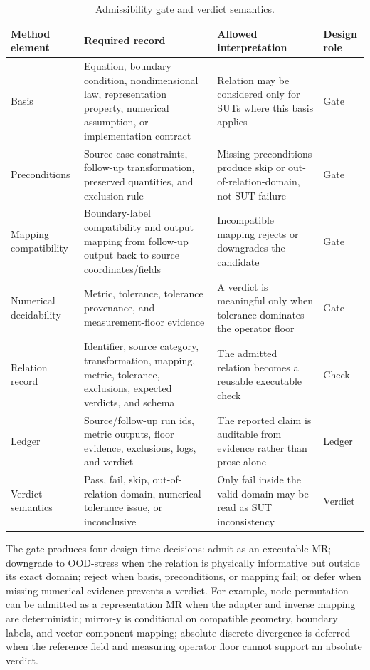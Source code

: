 \documentclass[preprint,12pt,authoryear]{elsarticle}
\begin{document}
\begin{table}[!htbp]
\centering
\caption{Admissibility gate and verdict semantics.}
\label{tab:admissibility-gate}
\footnotesize
\renewcommand{\arraystretch}{0.92}
\setlength{\tabcolsep}{3pt}
\begin{tabularx}{\textwidth}{@{}>{\raggedright\arraybackslash}p{}>{\raggedright\arraybackslash}p{}>{\raggedright\arraybackslash}p{}Y@{}}
\toprule
\textbf{Method element} & \textbf{Required record} & \textbf{Allowed interpretation} & \textbf{Design role} \\
\midrule
Basis & Equation, boundary condition, nondimensional law, representation property, numerical assumption, or implementation contract & Relation may be considered only for SUTs where this basis applies & Gate \\
Preconditions & Source-case constraints, follow-up transformation, preserved quantities, and exclusion rule & Missing preconditions produce skip or out-of-relation-domain, not SUT failure & Gate \\
Mapping compatibility & Boundary-label compatibility and output mapping from follow-up output back to source coordinates/fields & Incompatible mapping rejects or downgrades the candidate & Gate \\
Numerical decidability & Metric, tolerance, tolerance provenance, and measurement-floor evidence & A verdict is meaningful only when tolerance dominates the operator floor & Gate \\
Relation record & Identifier, source category, transformation, mapping, metric, tolerance, exclusions, expected verdicts, and schema & The admitted relation becomes a reusable executable check & Check \\
Ledger & Source/follow-up run ids, metric outputs, floor evidence, exclusions, logs, and verdict & The reported claim is auditable from evidence rather than prose alone & Ledger \\
Verdict semantics & Pass, fail, skip, out-of-relation-domain, numerical-tolerance issue, or inconclusive & Only fail inside the valid domain may be read as SUT inconsistency & Verdict \\
\bottomrule
\end{tabularx}
\end{table}

The gate produces four design-time decisions: admit as an executable MR; downgrade to OOD-stress when the relation is physically informative but outside its exact domain; reject when basis, preconditions, or mapping fail; or defer when missing numerical evidence prevents a verdict. For example, node permutation can be admitted as a representation MR when the adapter and inverse mapping are deterministic; mirror-y is conditional on compatible geometry, boundary labels, and vector-component mapping; absolute discrete divergence is deferred when the reference field and measuring operator floor cannot support an absolute verdict.
\end{document}
